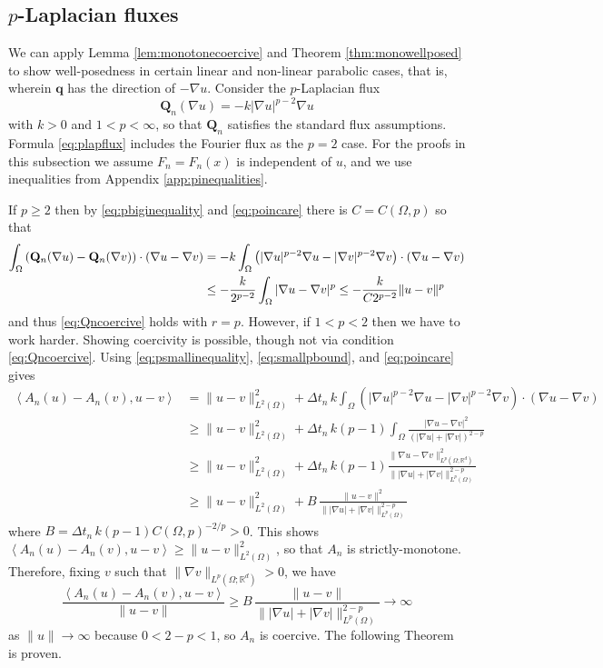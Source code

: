 \documentclass[final,onefignum]{siamart190516}
\newcommand\bq{\mathbf{q}}
\newcommand\bQ{\mathbf{Q}}
\newcommand{\grad}{\nabla}
\newcommand{\ip}[2]{\ensuremath{\left<#1,#2\right>}}
\newcommand\RR{\mathbb{R}}
\begin{document}
\subsection{$p$-Laplacian fluxes} \label{subsec:plap}  We can apply Lemma \ref{lem:monotonecoercive} and Theorem \ref{thm:monowellposed} to show well-posedness in certain linear and non-linear parabolic cases, that is, wherein $\bq$ has the direction of $-\grad u$.  Consider the $p$-Laplacian \cite{Evans2010} flux
\begin{equation}
  \bQ_n(\grad u) = - k |\grad u|^{p-2} \grad u \label{eq:plapflux}
\end{equation}
with $k>0$ and $1<p<\infty$, so that $\bQ_n$ satisfies the standard flux assumptions.  Formula \eqref{eq:plapflux} includes the Fourier flux as the $p=2$ case.  For the proofs in this subsection we assume $F_n=F_n(x)$ is independent of $u$, and we use inequalities from Appendix \ref{app:pinequalities}.

If $p\ge 2$ then by \eqref{eq:pbiginequality} and \eqref{eq:poincare} there is $C=C(\Omega,p)$ so that
\begin{align}
\int_\Omega \left(\bQ_n(\grad u) - \bQ_n(\grad v)\right)\cdot (\grad u - \grad v) &= -k  \int_\Omega \left(|\grad u|^{p-2} \grad u - |\grad v|^{p-2} \grad v\right)\cdot (\grad u - \grad v) \notag \\
  &\le - \frac{k}{2^{p-2}} \int_\Omega |\grad u - \grad v|^p \le - \frac{k}{C 2^{p-2}} \|u-v\|^p \label{eq:plapQnmono}
\end{align}
and thus \eqref{eq:Qncoercive} holds with $r=p$.  However, if  $1<p<2$ then we have to work harder.  Showing coercivity is possible, though not via condition \eqref{eq:Qncoercive}.  Using \eqref{eq:psmallinequality}, \eqref{eq:smallpbound}, and \eqref{eq:poincare} gives
\begin{align*}
\ip{A_n(u) - A_n(v)}{u-v} &= \|u-v\|_{L^2(\Omega)}^2 + \Delta t_n\,k \int_\Omega \left(|\grad u|^{p-2} \grad u - |\grad v|^{p-2} \grad v\right)\cdot (\grad u - \grad v) \\
  &\ge \|u-v\|_{L^2(\Omega)}^2 + \Delta t_n\,k (p-1) \int_\Omega \frac{|\grad u - \grad v|^2}{\left(|\grad u|+|\grad v|\right)^{2-p}} \\
  &\ge \|u-v\|_{L^2(\Omega)}^2 + \Delta t_n\,k (p-1) \frac{\|\grad u - \grad v\|_{L^p(\Omega; \RR^d)}^2}{\big\||\grad u|+|\grad v|\big\|_{L^p(\Omega)}^{2-p}} \\
  &\ge \|u-v\|_{L^2(\Omega)}^2 + B\, \frac{\|u - v\|^2}{\big\||\grad u|+|\grad v|\big\|_{L^p(\Omega)}^{2-p}}
\end{align*}
where $B = \Delta t_n\,k (p-1) C(\Omega,p)^{-2/p} >0$.  This shows $\ip{A_n(u) - A_n(v)}{u-v} \ge \|u-v\|_{L^2(\Omega)}^2$, so that $A_n$ is strictly-monotone.  Therefore, fixing $v$ such that $\|\grad v\|_{L^p(\Omega;\RR^d)} >0$, we have
\begin{equation*}
\frac{\ip{A_n(u) - A_n(v)}{u-v}}{\|u-v\|} \ge B\, \frac{\|u - v\|}{\big\||\grad u|+|\grad v|\big\|_{L^p(\Omega)}^{2-p}} \to \infty
\end{equation*}
as $\|u\|\to\infty$ because $0<2-p<1$, so $A_n$ is coercive.  The following Theorem is proven.
\end{document}
